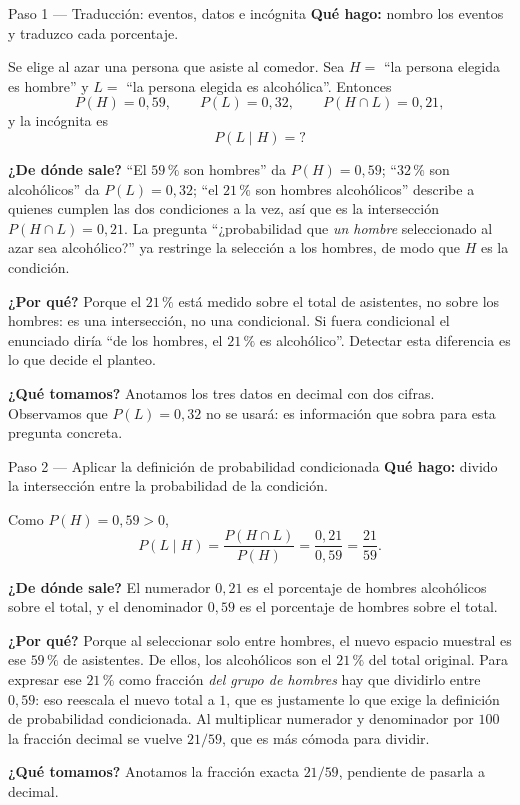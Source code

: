 \documentclass[11pt]{article}
\begin{document}
\begin{paso}{Paso 1 --- Traducción: eventos, datos e incógnita}
\textbf{Qué hago:} nombro los eventos y traduzco cada porcentaje.

Se elige al azar una persona que asiste al comedor. Sea $H=$ ``la persona elegida es hombre'' y $L=$ ``la persona elegida es alcohólica''. Entonces
\[
P(H)=0{,}59,\qquad P(L)=0{,}32,\qquad P(H\cap L)=0{,}21,
\]
y la incógnita es
\[
P(L\mid H)=?
\]

\textbf{¿De dónde sale?} ``El $59\,\%$ son hombres'' da $P(H)=0{,}59$; ``$32\,\%$ son alcohólicos'' da $P(L)=0{,}32$; ``el $21\,\%$ son hombres alcohólicos'' describe a quienes cumplen las dos condiciones a la vez, así que es la intersección $P(H\cap L)=0{,}21$. La pregunta ``¿probabilidad que \emph{un hombre} seleccionado al azar sea alcohólico?'' ya restringe la selección a los hombres, de modo que $H$ es la condición.

\textbf{¿Por qué?} Porque el $21\,\%$ está medido sobre el total de asistentes, no sobre los hombres: es una intersección, no una condicional. Si fuera condicional el enunciado diría ``de los hombres, el $21\,\%$ es alcohólico''. Detectar esta diferencia es lo que decide el planteo.

\textbf{¿Qué tomamos?} Anotamos los tres datos en decimal con dos cifras. Observamos que $P(L)=0{,}32$ no se usará: es información que sobra para esta pregunta concreta.
\end{paso}

\begin{paso}{Paso 2 --- Aplicar la definición de probabilidad condicionada}
\textbf{Qué hago:} divido la intersección entre la probabilidad de la condición.

Como $P(H)=0{,}59>0$,
\[
P(L\mid H)=\frac{P(H\cap L)}{P(H)}=\frac{0{,}21}{0{,}59}=\frac{21}{59}.
\]

\textbf{¿De dónde sale?} El numerador $0{,}21$ es el porcentaje de hombres alcohólicos sobre el total, y el denominador $0{,}59$ es el porcentaje de hombres sobre el total.

\textbf{¿Por qué?} Porque al seleccionar solo entre hombres, el nuevo espacio muestral es ese $59\,\%$ de asistentes. De ellos, los alcohólicos son el $21\,\%$ del total original. Para expresar ese $21\,\%$ como fracción \emph{del grupo de hombres} hay que dividirlo entre $0{,}59$: eso reescala el nuevo total a $1$, que es justamente lo que exige la definición de probabilidad condicionada. Al multiplicar numerador y denominador por $100$ la fracción decimal se vuelve $21/59$, que es más cómoda para dividir.

\textbf{¿Qué tomamos?} Anotamos la fracción exacta $21/59$, pendiente de pasarla a decimal.
\end{paso}
\end{document}
